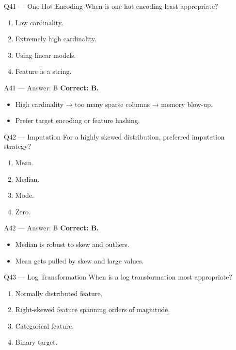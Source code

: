 \documentclass[aspectratio=169,10pt]{beamer}
\begin{document}
	\begin{frame}{Q41 — One-Hot Encoding}
		When is one-hot encoding least appropriate?
		\begin{enumerate}[label=\Alph*.]
			\item Low cardinality.
			\item Extremely high cardinality.
			\item Using linear models.
			\item Feature is a string.
		\end{enumerate}
	\end{frame}
	
	\begin{frame}{A41 — Answer: B}
		\textbf{Correct: B.}
		\begin{itemize}
			\item High cardinality → too many sparse columns → memory blow-up.
			\item Prefer target encoding or feature hashing.
		\end{itemize}
	\end{frame}
	
	\begin{frame}{Q42 — Imputation}
		For a highly skewed distribution, preferred imputation strategy?
		\begin{enumerate}[label=\Alph*.]
			\item Mean.
			\item Median.
			\item Mode.
			\item Zero.
		\end{enumerate}
	\end{frame}
	
	\begin{frame}{A42 — Answer: B}
		\textbf{Correct: B.}
		\begin{itemize}
			\item Median is robust to skew and outliers.
			\item Mean gets pulled by skew and large values.
		\end{itemize}
	\end{frame}
	
	\begin{frame}{Q43 — Log Transformation}
		When is a log transformation most appropriate?
		\begin{enumerate}[label=\Alph*.]
			\item Normally distributed feature.
			\item Right-skewed feature spanning orders of magnitude.
			\item Categorical feature.
			\item Binary target.
		\end{enumerate}
	\end{frame}
	
\end{document}
